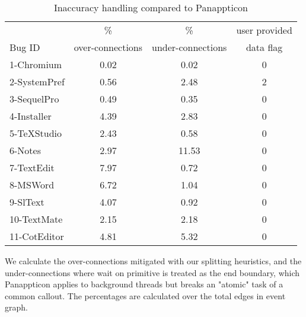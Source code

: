 
\begin{table}[ht]
\footnotesize
\centering
  \begin{tabularx}{\columnwidth}{l|ccc}
  \hline
       & \% & \% & user provided \\
Bug ID & over-connections& under-connections & data flag \\
\hline
\hline
1-Chromium & 0.02 & 0.02 & 0 \\
2-SystemPref & 0.56 & 2.48 & 2 \\
3-SequelPro & 0.49 & 0.35 & 0 \\
4-Installer & 4.39 & 2.83 & 0 \\
5-TeXStudio & 2.43 & 0.58 & 0 \\
6-Notes & 2.97 & 11.53 & 0 \\
7-TextEdit & 7.97 & 0.72 & 0 \\
8-MSWord & 6.72 & 1.04 & 0 \\
9-SlText & 4.07 & 0.92 & 0 \\
10-TextMate & 2.15 & 2.18 & 0 \\
11-CotEditor & 4.81 & 5.32 & 0 \\
\hline
  \end{tabularx}
  \parbox{\columnwidth}
  {\caption{Inaccuracy handling compared to Panappticon} 
  	\vspace{-0.3cm}
  	{
		We calculate the over-connections mitigated with our splitting heuristics, and
	the under-connections where wait on primitive is treated as the end boundary,
	which Panappticon applies to background threads but breaks an "atomic" task
	of a common callout. The percentages are calculated over the total edges in event graph.
    }
  \label{table:statistics}
  }
\end{table}


